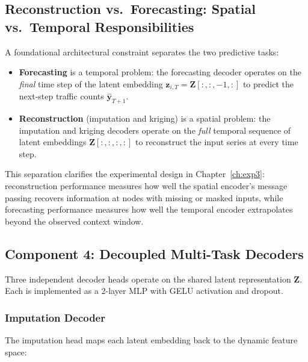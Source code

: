 \subsection{Reconstruction vs.\ Forecasting: Spatial vs.\ Temporal Responsibilities}
\label{subsec:meth-spatial-vs-temporal}

A foundational architectural constraint separates the two predictive tasks:

\begin{itemize}
    \item \textbf{Forecasting} is a temporal problem: the forecasting decoder operates on the \emph{final} time step of the latent embedding $\mathbf{z}_{i,T} = \mathbf{Z}[:, :, -1, :]$ to predict the next-step traffic counts $\hat{\mathbf{y}}_{T+1}$.
    \item \textbf{Reconstruction} (imputation and kriging) is a spatial problem: the imputation and kriging decoders operate on the \emph{full} temporal sequence of latent embeddings $\mathbf{Z}[:, :, :, :]$ to reconstruct the input series at every time step.
\end{itemize}

\noindent This separation clarifies the experimental design in Chapter~\ref{ch:exp3}: reconstruction performance measures how well the spatial encoder's message passing recovers information at nodes with missing or masked inputs, while forecasting performance measures how well the temporal encoder extrapolates beyond the observed context window.

\subsection{Component 4: Decoupled Multi-Task Decoders}
\label{subsec:meth-decoders}

Three independent decoder heads operate on the shared latent representation $\mathbf{Z}$. Each is implemented as a 2-layer MLP with GELU activation and dropout.

\subsubsection{Imputation Decoder}

The imputation head maps each latent embedding back to the dynamic feature space:

